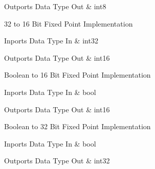 \begin{XtoCtabular}{Outports Data Type}
Out & int8\tabularnewline
\hline
\end{XtoCtabular}

\ifdefined \AddTestReports
{}
\fi
{}
\nopagebreak[0]

32 to 16 Bit Fixed Point Implementation

\begin{XtoCtabular}{Inports Data Type}
In & int32\tabularnewline
\hline
\end{XtoCtabular}

\begin{XtoCtabular}{Outports Data Type}
Out & int16\tabularnewline
\hline
\end{XtoCtabular}

\ifdefined \AddTestReports
{}
\fi
{}
\nopagebreak[0]

Boolean to 16 Bit Fixed Point Implementation

\begin{XtoCtabular}{Inports Data Type}
In & bool\tabularnewline
\hline
\end{XtoCtabular}

\begin{XtoCtabular}{Outports Data Type}
Out & int16\tabularnewline
\hline
\end{XtoCtabular}

\ifdefined \AddTestReports
{}
\fi
{}
\nopagebreak[0]

Boolean to 32 Bit Fixed Point Implementation

\begin{XtoCtabular}{Inports Data Type}
In & bool\tabularnewline
\hline
\end{XtoCtabular}

\begin{XtoCtabular}{Outports Data Type}
Out & int32\tabularnewline
\hline
\end{XtoCtabular}

\ifdefined \AddTestReports
{}
\fi
{}
\nopagebreak[0]

